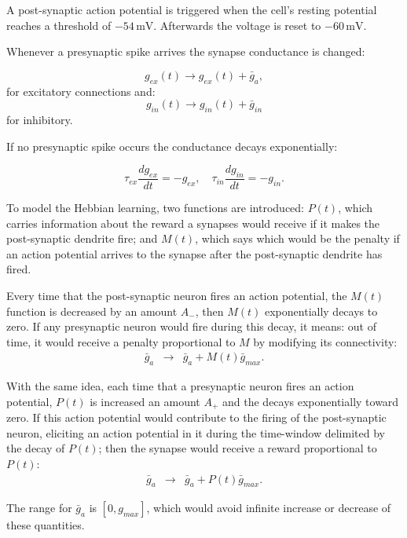 \documentclass[a4paper,12pt,oneside]{article}
\newcommand{\unit}[1]{\ensuremath{\, \mathrm{#1}}}
\begin{document}
A post-synaptic action potential is triggered when the cell's resting
potential reaches a threshold of $-54\unit{mV}$. Afterwards the
voltage is reset to $-60\unit{mV}$.

Whenever a presynaptic spike arrives the synapse conductance is changed:

\[
g_{ex}(t) \rightarrow g_{ex}(t)+\bar{g}_{a}, 
\]
for excitatory connections and: 
\[
g_{in}(t) \rightarrow g_{in}(t)+\bar{g}_{in}
\]
for inhibitory. 

If no presynaptic spike occurs the conductance decays exponentially:

\[
\tau_{ex} \frac{dg_{ex}}{dt} = -g_{ex},\hspace{1em} \tau_{in} \frac{dg_{in}}{dt} = -g_{in}. 
\]

	To model the Hebbian learning, two functions are introduced: $P(t)$, which carries information about the reward a synapses would receive if it makes the post-synaptic dendrite fire; and $M(t)$, which says which would be the penalty if an action potential arrives to the synapse after the post-synaptic dendrite has fired. 
	
	Every time that the post-synaptic neuron fires an action potential, the $M(t)$ function is decreased by an amount $A_-$, then $M(t)$ exponentially decays to zero. If any presynaptic neuron would fire during this decay, it means: out of time, it would receive a penalty proportional to $M$ by modifying its connectivity: 
		\begin{eqnarray} 
			\bar{g}_a &\rightarrow& \bar{g}_a + M(t)\bar{g}_{max}. 
		\end{eqnarray}
		
	With the same idea, each time that a presynaptic neuron fires an action potential, $P(t)$ is increased an amount $A_+$ and the decays exponentially toward zero. If this action potential would contribute to the firing of the post-synaptic neuron, eliciting an action potential in it during the time-window delimited by the decay of $P(t)$; then the synapse would receive a reward proportional to $P(t)$:
		\begin{eqnarray} 
			\bar{g}_a &\rightarrow& \bar{g}_a + P(t)\bar{g}_{max}. 
		\end{eqnarray}

	The range for $\bar{g}_a$ is $[0,g_{max}]$, which would avoid infinite increase or decrease of these quantities. 
	
\end{document}
